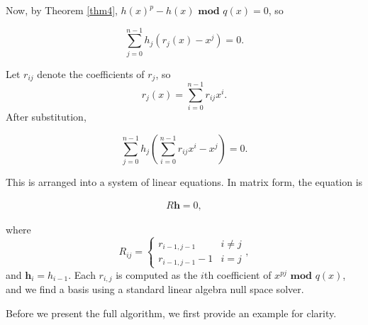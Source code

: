 \documentclass{article}
\theoremstyle{definition}
\begin{document}
    Now, by Theorem \ref{thm4}, $h(x)^p-h(x) \textbf{ mod } q(x) = 0$, so 
    
    \begin{equation*}
        \sum_{j=0}^{n-1}h_j(r_j(x) - x^j) = 0.
    \end{equation*}
    
    Let $r_{ij}$ denote the coefficients of $r_j$, so \[ r_j(x) = \sum_{i=0}^{n-1}r_{ij}x^i.\] After substitution,
    
    \begin{equation*}
        \sum_{j=0}^{n-1}h_j(\sum_{i=0}^{n-1}r_{ij}x^i - x^j) = 0.
    \end{equation*}
    
    
    This is arranged into a system of linear equations. In matrix form, the equation is 
    
    \begin{align*}
        R\mathbf{h} = 0,
    \end{align*}
    
    where \[R_{ij} =  \begin{cases}
        r_{i-1,j-1} & i \neq j \\
        r_{i-1,j-1} -1 & i = j
    \end{cases},\] and $\mathbf{h}_i = h_{i-1}$. Each $r_{i,j}$ is computed as the $i$th coefficient of $x^{pj} \textbf{ mod } q(x)$, and we find a basis using a standard linear algebra null space solver.
    
    Before we present the full algorithm, we first provide an example for clarity. 
    
\end{document}
